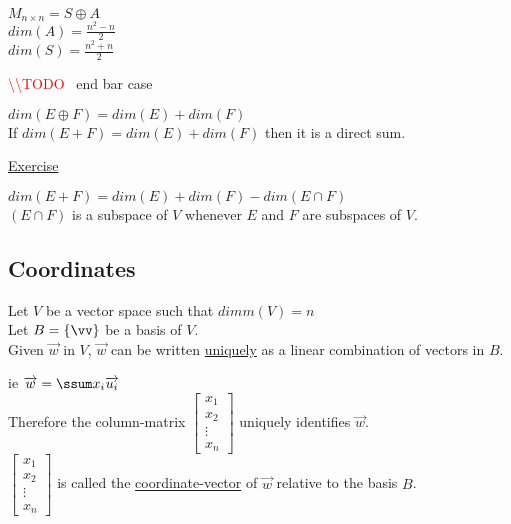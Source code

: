 \documentclass[12pt]{article}
\renewcommand{\v}[1]{\overrightarrow{#1}}
\newcommand\m[1]{\begin{bmatrix}#1\end{bmatrix}}
\newenvironment{block}[1][Label]{\underline{#1}\par}{}
\newcommand{\todo}[0]{\textcolor{red}{\textbackslash\textbackslash TODO \ }}
\newcommand{\bb}[1]{\left\{#1\right\}}
\begin{document}
$M_{n \times n} = S \oplus A$ \\
$dim(A) = \frac{n^2 - n}{2}$ \\
$dim(S) = \frac{n^2 + n}{2}$

\todo end bar case

$dim(E \oplus F) = dim(E) + dim(F)$ \\
If $dim(E + F) = dim(E) + dim(F)$ then it is a direct sum.

\begin{block}[Exercise]
$dim(E + F) = dim(E) + dim(F) - dim(E \cap F)$ \\
$(E \cap F)$ is a subspace of $V$ whenever $E$ and $F$ are subspaces of $V$.
\end{block}

\subsection{Coordinates}

Let $V$ be a vector space such that $dimm(V) = n$ \\
Let $B = \bb{\vv}$ be a basis of $V$. \\
Given $\v{w}$ in $V$, $\v{w}$ can be written \underline{uniquely} as a linear combination of vectors in $B$.

ie $\v{w} = \ssum x_i \v{u_i}$ \\

Therefore the column-matrix $\m{x_1 \\ x_2 \\ \vdots \\ x_n}$ uniquely identifies $\v{w}$. \\

$\m{x_1 \\ x_2 \\ \vdots \\ x_n}$ is called the \underline{coordinate-vector} of $\v{w}$ relative to the basis $B$.
\end{document}
